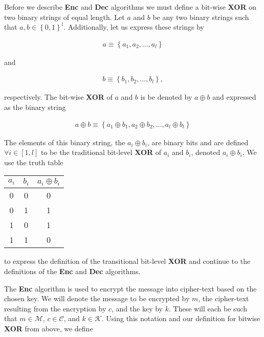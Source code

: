 \documentclass{article}[12]
\numberwithin{equation}{section}
\begin{document}
\begin{flushleft}
Before we describe {\selectfont \textbf{Enc}} and {\selectfont \textbf{Dec}} algorithms we must define a bit-wise \textbf{XOR} on two binary strings of equal length. Let $a$ and $b$ be any two binary strings such that $a, b \in \left\{ 0, 1 \right\}^l$.  Additionally, let us express these strings by

\begin{align*}
a \equiv \left\{ a_1, a_2, \dots, a_l \right\}
\end{align*} 

and

\begin{align*}
b \equiv \left\{ b_1, b_2, \dots, b_l \right\},
\end{align*}

respectively. The bit-wise \textbf{XOR} of $a$ and $b$ is be denoted by $a \oplus b$ and expressed as the binary string

\begin{align*}
a \oplus b \equiv \left\{ a_1 \oplus b_1, a_2 \oplus b_2, \dots, a_l \oplus b_l \right\}
\end{align*}

The elements of this binary string, the $a_i \oplus b_i$, are binary bits and are defined $\forall i \in \left[ 1, l \right]$ to be the traditional bit-level \textbf{XOR} of $a_i$ and $b_i$, denoted $a_i \oplus b_i$. We use the truth table

\end{flushleft} \begin{center}
\begin{tabular}{c | c || c}
$a_i$ & $b_i$ & $a_i \oplus b_i$ \\
\hline
0 & 0 & 0 \\
0 & 1 & 1 \\
1 & 0 & 1 \\
1 & 1 & 0
\end{tabular}
\end{center} \begin{flushleft}

to express the definition of the transitional bit-level \textbf{XOR} and continue to the definitions of the {\selectfont \textbf{Enc}} and {\selectfont \textbf{Dec}} algorithms. \newline

The {\selectfont \textbf{Enc}} algorithm is used to encrypt the message into cipher-text based on the chosen key.  We will denote the message to be encrypted by $m$, the cipher-text resulting from the encryption by $c$, and the key by $k$.  These will each be such that $m \in \mathcal{M}$, $c \in \mathcal{C}$, and $k \in \mathcal{K}$.  Using this notation and our definition for bitwise \textbf{XOR} from above, we define


\end{flushleft}
\end{document}
